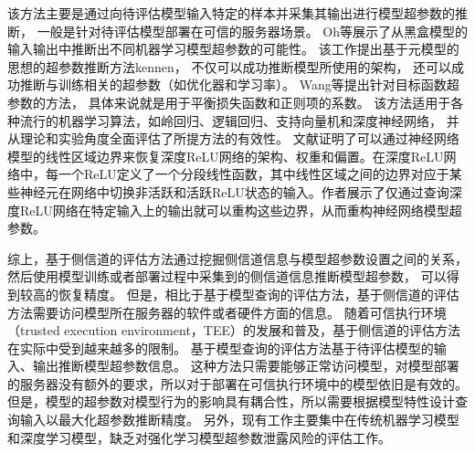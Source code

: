 该方法主要是通过向待评估模型输入特定的样本并采集其输出进行模型超参数的推断，
一般是针对待评估模型部署在可信的服务器场景。
Oh等\cite{DBLP:conf/iclr/OhAFS18}展示了从黑盒模型的输入输出中推断出不同机器学习模型超参数的可能性。
该工作提出基于元模型的思想的超参数推断方法kennen，
不仅可以成功推断模型所使用的架构，
还可以成功推断与训练相关的超参数（如优化器和学习率）。
Wang等\cite{DBLP:conf/sp/WangG18}提出针对目标函数超参数的方法，
具体来说就是用于平衡损失函数和正则项的系数。
该方法适用于各种流行的机器学习算法，如岭回归、逻辑回归、支持向量机和深度神经网络，
并从理论和实验角度全面评估了所提方法的有效性。
文献{\rm\parencite{Rolnick2019ReverseengineeringDR}}证明了可以通过神经网络模型的线性区域边界来恢复深度ReLU网络的架构、权重和偏置。在深度ReLU网络中，每一个ReLU定义了一个分段线性函数，其中线性区域之间的边界对应于某些神经元在网络中切换非活跃和活跃ReLU状态的输入。作者展示了仅通过查询深度ReLU网络在特定输入上的输出就可以重构这些边界，从而重构神经网络模型超参数。 

综上，基于侧信道的评估方法通过挖掘侧信道信息与模型超参数设置之间的关系，
然后使用模型训练或者部署过程中采集到的侧信道信息推断模型超参数，
可以得到较高的恢复精度。
但是，相比于基于模型查询的评估方法，基于侧信道的评估方法需要访问模型所在服务器的软件或者硬件方面的信息。
随着可信执行环境（trusted execution environment，TEE）的发展和普及，基于侧信道的评估方法在实际中受到越来越多的限制。
基于模型查询的评估方法基于待评估模型的输入、输出推断模型超参数信息。
这种方法只需要能够正常访问模型，对模型部署的服务器没有额外的要求，所以对于部署在可信执行环境中的模型依旧是有效的。
但是，模型的超参数对模型行为的影响具有耦合性，所以需要根据模型特性设计查询输入以最大化超参数推断精度。
另外，现有工作主要集中在传统机器学习模型和深度学习模型，缺乏对强化学习模型超参数泄露风险的评估工作。

